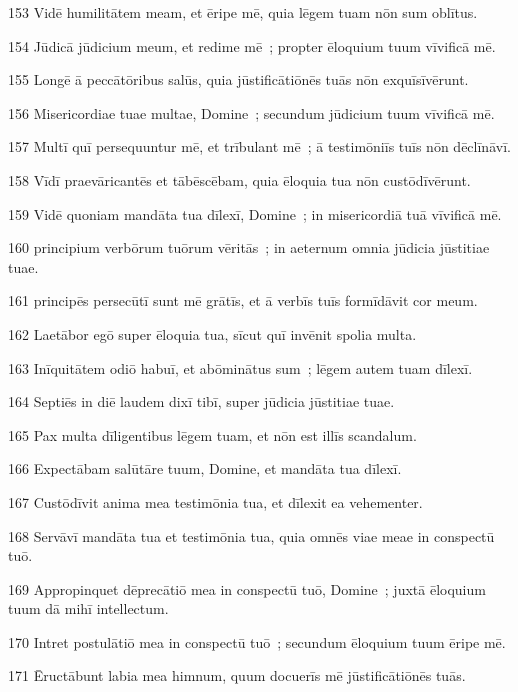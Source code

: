 \psalmVerse
  {153}
  {Vidē humilitātem meam, et ēripe mē, quia lēgem tuam nōn sum oblītus.}


\psalmVerse
  {154}
  {Jūdicā jūdicium meum, et redime mē~; propter ēloquium tuum vīvificā mē.}


\psalmVerse
  {155}
  {Longē ā peccātōribus salūs, quia jūstificātiōnēs tuās nōn exquīsīvērunt.}


\psalmVerse
  {156}
  {Misericordiae tuae multae, Domine~; secundum jūdicium tuum vīvificā mē.}


\psalmVerse
  {157}
  {Multī quī persequuntur mē, et trībulant mē~; ā testimōniīs tuīs nōn dēclīnāvī.}


\psalmVerse
  {158}
  {Vīdī praevāricantēs et tābēscēbam, quia ēloquia tua nōn custōdīvērunt.}


\psalmVerse
  {159}
  {Vidē quoniam mandāta tua dīlexī, Domine~; in misericordiā tuā vīvificā mē.}


\psalmVerse
  {160}
  {principium verbōrum tuōrum vēritās~; in aeternum omnia jūdicia jūstitiae tuae.}


\psalmVerse
  {161}
  {principēs persecūtī sunt mē grātīs, et ā verbīs tuīs formīdāvit cor meum.}


\psalmVerse
  {162}
  {Laetābor egō super ēloquia tua, sīcut quī invēnit spolia multa.}


\psalmVerse
  {163}
  {Inīquitātem odiō habuī, et abōminātus sum~; lēgem autem tuam dīlexī.}


\psalmVerse
  {164}
  {Septiēs in diē laudem dixī tibī, super jūdicia jūstitiae tuae.}


\psalmVerse
  {165}
  {Pax multa dīligentibus lēgem tuam, et nōn est illīs scandalum.}


\psalmVerse
  {166}
  {Expectābam salūtāre tuum, Domine, et mandāta tua dīlexī.}


\psalmVerse
  {167}
  {Custōdīvit anima mea testimōnia tua, et dīlexit ea vehementer.}


\psalmVerse
  {168}
  {Servāvī mandāta tua et testimōnia tua, quia omnēs viae meae in conspectū tuō.}


\psalmVerse
  {169}
  {Appropinquet dēprecātiō mea in conspectū tuō, Domine~; juxtā ēloquium tuum dā mihī intellectum.}


\psalmVerse
  {170}
  {Intret postulātiō mea in conspectū tuō~; secundum ēloquium tuum ēripe mē.}


\psalmVerse
  {171}
  {Ēructābunt labia mea himnum, quum docuerīs mē jūstificātiōnēs tuās.}


